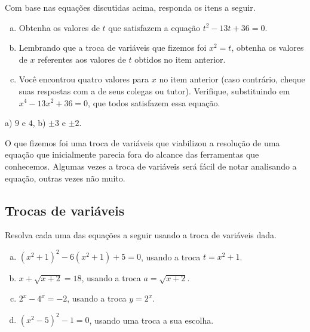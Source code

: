 \documentclass[main.tex]{subfiles}
\begin{document}
\begin{questao}
Com base nas equações discutidas acima, responda os itens a seguir.
\begin{enumerate}[a)]
\item Obtenha os valores de $t$ que satisfazem a equação $t^2-13t+36=0$.
\item Lembrando que a troca de variáveis que fizemos foi $x^2=t$, obtenha os valores de $x$ referentes aos valores de $t$ obtidos no item anterior.
\item Você encontrou quatro valores para $x$ no item anterior (caso contrário, cheque suas respostas com a de seus colegas ou tutor). Verifique, substituindo em $x^4-13x^2+36=0$, que todos satisfazem essa equação.
\end{enumerate}
\end{questao}


\begin{gabarito}
	\begin{gabaritoQuestao}
		a) $9$ e $4$, b) $\pm3$ e $\pm2$.
	\end{gabaritoQuestao}
\end{gabarito}

O que fizemos foi uma troca de variáveis que viabilizou a resolução de uma equação que inicialmente parecia fora do alcance das ferramentas que conhecemos. Algumas vezes a troca de variáveis será fácil de notar analisando a equação, outras vezes não muito.

\subsection*{Trocas de variáveis}

\begin{questao}
Resolva cada uma das equações a seguir usando a troca de variáveis dada.
\begin{enumerate}[a)]
\item $(x^2+1)^2-6(x^2+1)+5=0$, usando a troca $t=x^2+1$.
\item $x+\sqrt{x+2}=18$, usando a troca $a=\sqrt{x+2}$.
\item $2^x-4^x=-2$, usando a troca $y=2^x$.
\item $(x^2-5)^2-1=0$, usando uma troca a sua escolha.
\end{enumerate}
\end{questao}
\end{document}
